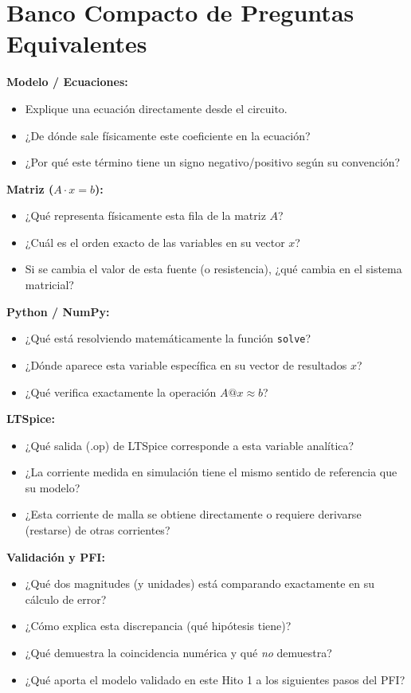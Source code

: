 \documentclass[11pt, a4paper]{article}
\begin{document}
\section*{Banco Compacto de Preguntas Equivalentes}
\begin{tcolorbox}[colback=white, colframe=black, boxrule=0.5pt, arc=2mm]
\textbf{Modelo / Ecuaciones:}
\begin{itemize}\setlength\itemsep{-0.2em}
    \item Explique una ecuación directamente desde el circuito.
    \item ¿De dónde sale físicamente este coeficiente en la ecuación?
    \item ¿Por qué este término tiene un signo negativo/positivo según su convención?
\end{itemize}
\textbf{Matriz ($A\cdot x=b$):}
\begin{itemize}\setlength\itemsep{-0.2em}
    \item ¿Qué representa físicamente esta fila de la matriz $A$?
    \item ¿Cuál es el orden exacto de las variables en su vector $x$?
    \item Si se cambia el valor de esta fuente (o resistencia), ¿qué cambia en el sistema matricial?
\end{itemize}
\textbf{Python / NumPy:}
\begin{itemize}\setlength\itemsep{-0.2em}
    \item ¿Qué está resolviendo matemáticamente la función \texttt{solve}?
    \item ¿Dónde aparece esta variable específica en su vector de resultados $x$?
    \item ¿Qué verifica exactamente la operación $A @ x \approx b$?
\end{itemize}
\textbf{LTSpice:}
\begin{itemize}\setlength\itemsep{-0.2em}
    \item ¿Qué salida (.op) de LTSpice corresponde a esta variable analítica?
    \item ¿La corriente medida en simulación tiene el mismo sentido de referencia que su modelo?
    \item ¿Esta corriente de malla se obtiene directamente o requiere derivarse (restarse) de otras corrientes?
\end{itemize}
\textbf{Validación y PFI:}
\begin{itemize}\setlength\itemsep{-0.2em}
    \item ¿Qué dos magnitudes (y unidades) está comparando exactamente en su cálculo de error?
    \item ¿Cómo explica esta discrepancia (qué hipótesis tiene)?
    \item ¿Qué demuestra la coincidencia numérica y qué \textit{no} demuestra?
    \item ¿Qué aporta el modelo validado en este Hito 1 a los siguientes pasos del PFI?
\end{itemize}
\end{tcolorbox}
\newpage
\end{document}
